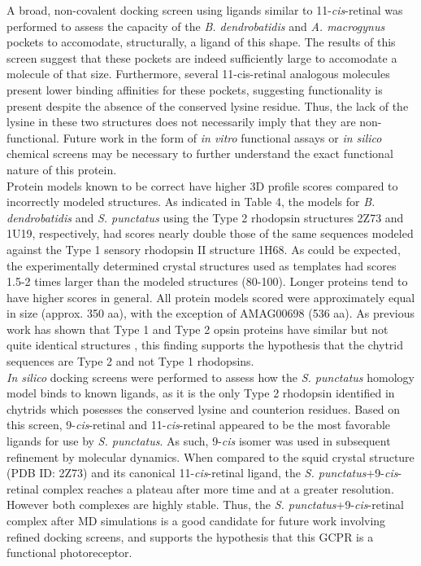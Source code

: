 \indent A broad, non-covalent docking screen using ligands similar to 11-\textit{cis}-retinal was performed to assess the capacity of the \textit{B. dendrobatidis} and \textit{A. macrogynus} pockets to accomodate, structurally, a ligand of this shape. The results of this screen suggest that these pockets are indeed sufficiently large to accomodate a molecule of that size. Furthermore, several 11-cis-retinal analogous molecules present lower binding affinities for these pockets, suggesting functionality is present despite the absence of the conserved lysine residue. Thus, the lack of the lysine in these two structures does not necessarily imply that they are non-functional. Future work in the form of \textit{in vitro} functional assays or \textit{in silico} chemical screens may be necessary to further understand the exact functional nature of this protein.\\
\indent Protein models known to be correct have higher 3D profile scores \cite{Luthy1992} compared to incorrectly modeled structures. As indicated in Table 4, the models for \textit{B. dendrobatidis} and \textit{S. punctatus} using the Type 2 rhodopsin structures 2Z73 and 1U19, respectively, had scores nearly double those of the same sequences modeled against the Type 1 sensory rhodopsin II structure 1H68. As could be expected, the experimentally determined crystal structures used as templates had scores 1.5-2 times larger than the modeled structures (80-100). Longer proteins tend to have higher scores in general. All protein models scored were approximately equal in size (approx. 350 aa), with the exception of AMAG00698 (536 aa). As previous work has shown that Type 1 and Type 2 opsin proteins have similar but not quite identical structures \cite{Spudich2000}, this finding supports the hypothesis that the chytrid sequences are Type 2 and not Type 1 rhodopsins.\\
\indent \textit{In silico} docking screens were performed to assess how the \textit{S. punctatus} homology model binds to known ligands, as it is the only Type 2 rhodopsin identified in chytrids which posesses the conserved lysine and counterion residues. Based on this screen, 9-\textit{cis}-retinal and 11-\textit{cis}-retinal appeared to be the most favorable ligands for use by \textit{S. punctatus}. As such, 9-\textit{cis} isomer was used in subsequent refinement by molecular dynamics. When compared to the squid crystal structure (PDB ID: 2Z73) and its canonical 11-\textit{cis}-retinal ligand, the \textit{S. punctatus}+9-\textit{cis}-retinal complex reaches a plateau after more time and at a greater resolution. However both complexes are highly stable. Thus, the \textit{S. punctatus}+9-\textit{cis}-retinal complex after MD simulations is a good candidate for future work involving refined docking screens, and supports the hypothesis that this GCPR is a functional photoreceptor.\\
